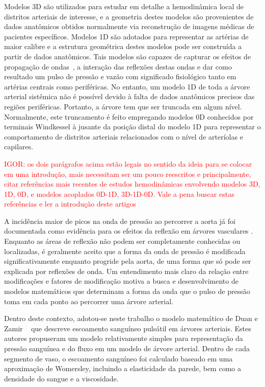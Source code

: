 \documentclass[a4paper,12pt]{monografia}
\theoremstyle{plain}
\theoremstyle{definition}
\theoremstyle{remark}
\begin{document}
Modelos 3D \cite{Peskin1972,Taylor1998} são utilizados para estudar em detalhe a hemodinâmica local de distritos arteriais de interesse, e a geometria destes modelos são provenientes de dados anatômicos obtidos normalmente via reconstrução de imagens médicas de pacientes específicos. Modelos 1D \cite{Avolio,Formaggia2003,Stergiopulos1992} são adotados para representar as artérias de maior calibre e a estrutura geométrica destes modelos pode ser construída a partir de dados anatômicos. Tais modelos são capazes de capturar os efeitos de propagação de ondas~\cite{Anliker1971,Duan}, a interação das reflexões destas ondas e dar como resultado um pulso de pressão e vazão com significado fisiológico tanto em artérias centrais como periféricas. No entanto, um modelo 1D de toda a árvore arterial sistêmica não é possível devido à falta de dados anatômicos precisos das regiões periféricas. Portanto, a árvore tem que ser truncada em algum nível. Normalmente, este truncamento é feito empregando modelos 0D \cite{Mates1988,Stergiopulos1992} conhecidos por terminais Windkessel à jusante da posição distal do modelo 1D para representar o comportamento de distritos arteriais relacionados com o nível de arteríolas e capilares. 

\textcolor{red}{IGOR: os dois parágrafos acima estão legais no sentido da ideia para se colocar em uma introdução, mais necessitam ser um pouco reescritos e principalmente, citar referências mais recentes de estudos hemodinâmicas envolvendo modelos 3D, 1D, 0D, e modelos acoplados 0D-1D, 3D-1D-0D. Vale a pena buscar estas referências e ler a introdução deste artigos}

A incidência maior de picos na onda de pressão ao percorrer a aorta já foi documentada como evidência para os efeitos da reflexão em árvores vasculares \cite{Kouchoukos,Lighthill,McDonald}. Enquanto as áreas de reflexão não podem ser completamente conhecidas ou localizadas, é geralmente aceito que a forma da onda de pressão é modificada significativamente enquanto progride pela aorta, de uma forma que só pode ser explicada por reflexões de onda.  Um entendimento mais claro da relação entre modificações e fatores de modificação motiva a busca e desenvolvimento de modelos matemáticos que determinam a forma da onda que o pulso de pressão toma em cada ponto ao percorrer uma árvore arterial. 

Dentro deste contexto, adotou-se neste trabalho o modelo matemático de Duan e Zamir ~\cite{Duan} que descreve escoamento sanguíneo pulsátil em árvores arteriais. Estes autores propuseram um modelo relativamente simples para representação da pressão sanguínea e do fluxo em um modelo de árvore arterial. Dentro de cada segmento de vaso, o escoamento sanguíneo foi calculado baseado em uma aproximação de Womersley, incluindo a elasticidade da parede, bem como a densidade do sangue e a viscosidade.
\end{document}
